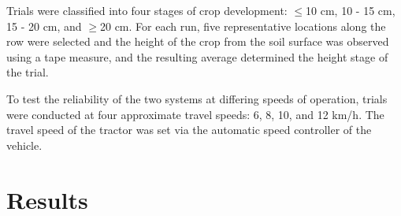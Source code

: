 \begin{flushleft}
\begin{flushleft}
Trials were classified into four stages of crop development: $\le$10 cm,
10 - 15 cm, 15 - 20 cm, and $\ge$20 cm. For each run, five representative
locations along the row were selected and the height of the crop from
the soil surface was observed using a tape measure, and the resulting
average determined the height stage of the trial.

To test the reliability of the two systems at differing speeds of
operation, trials were conducted at four approximate travel speeds: 6,
8, 10, and 12 km/h. The travel speed of the tractor was set via the
automatic speed controller of the vehicle.

\section{Results}
\begin{table}[h]
  \centering
  \caption{RMSE and 95$^{th}$ Percentile
    with respect to crop-stage.} 
  \label{table:travel_speed}
\end{table}


\end{flushleft}
\end{flushleft}
